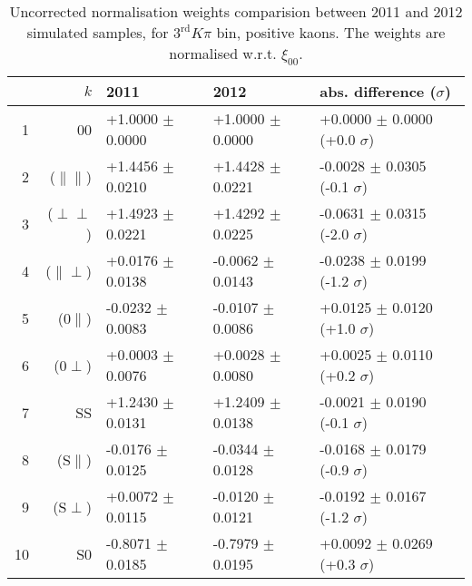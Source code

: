 \begin{table}[hbtp]
  \caption{\small Uncorrected normalisation weights comparision between 2011 and 2012 simulated samples, for $3^{\text{rd}}K\pi$ bin, positive kaons. The weights are normalised w.r.t. $\xi_{00}$.}
  \center\footnotesize
  \begin{tabular}{r r l l l}      
  \multicolumn{2}{r}{$k$}            & 2011             & 2012              &   abs. difference ($\sigma$)        \\
   \hline 
  1   & 00                   & +1.0000 $\pm$  0.0000  &  +1.0000 $\pm$  0.0000  &  +0.0000 $\pm$  0.0000 (+0.0 $\sigma$) \\
  2   & ($\parallel\parallel$) & +1.4456 $\pm$  0.0210  &  +1.4428 $\pm$  0.0221  &  -0.0028 $\pm$  0.0305 (-0.1 $\sigma$) \\
  3   & ($\perp\perp$)       & +1.4923 $\pm$  0.0221  &  +1.4292 $\pm$  0.0225  &  -0.0631 $\pm$  0.0315 (-2.0 $\sigma$) \\
  4   & ($\parallel\perp$)   & +0.0176 $\pm$  0.0138  &  -0.0062 $\pm$  0.0143  &  -0.0238 $\pm$  0.0199 (-1.2 $\sigma$) \\
  5   & ($0\parallel$)       & -0.0232 $\pm$  0.0083  &  -0.0107 $\pm$  0.0086  &  +0.0125 $\pm$  0.0120 (+1.0 $\sigma$) \\
  6   & ($0\perp$)           & +0.0003 $\pm$  0.0076  &  +0.0028 $\pm$  0.0080  &  +0.0025 $\pm$  0.0110 (+0.2 $\sigma$) \\
  7   & SS                   & +1.2430 $\pm$  0.0131  &  +1.2409 $\pm$  0.0138  &  -0.0021 $\pm$  0.0190 (-0.1 $\sigma$) \\
  8   & (S$\parallel$)       & -0.0176 $\pm$  0.0125  &  -0.0344 $\pm$  0.0128  &  -0.0168 $\pm$  0.0179 (-0.9 $\sigma$) \\
  9   & (S$\perp$)           & +0.0072 $\pm$  0.0115  &  -0.0120 $\pm$  0.0121  &  -0.0192 $\pm$  0.0167 (-1.2 $\sigma$) \\
  10  &  S0                   & -0.8071 $\pm$  0.0185  &  -0.7979 $\pm$  0.0195  &  +0.0092 $\pm$  0.0269 (+0.3 $\sigma$) \\
\hline
\end{tabular}
\end{table}
